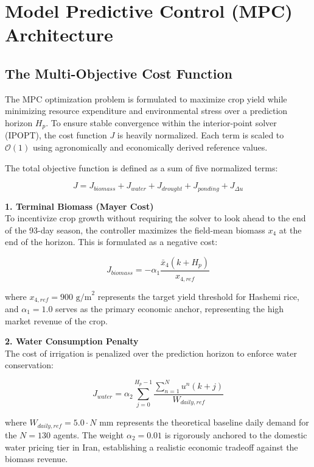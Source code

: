\documentclass[11pt, a4paper]{article}
\begin{document}
\section{Model Predictive Control (MPC) Architecture}

\subsection{The Multi-Objective Cost Function}
The MPC optimization problem is formulated to maximize crop yield while minimizing resource expenditure and environmental stress over a prediction horizon $H_p$. To ensure stable convergence within the interior-point solver (IPOPT), the cost function $J$ is heavily normalized. Each term is scaled to $\mathcal{O}(1)$ using agronomically and economically derived reference values.

The total objective function is defined as a sum of five normalized terms:

\begin{equation}
    J = J_{biomass} + J_{water} + J_{drought} + J_{ponding} + J_{\Delta u}
\end{equation}

\textbf{1. Terminal Biomass (Mayer Cost)} \\
To incentivize crop growth without requiring the solver to look ahead to the end of the 93-day season, the controller maximizes the field-mean biomass $x_4$ at the end of the horizon. This is formulated as a negative cost:

\begin{equation}
    J_{biomass} = -\alpha_1 \frac{\bar{x}_4(k+H_p)}{x_{4,ref}}
\end{equation}

where $x_{4,ref} = 900 \text{ g/m}^2$ represents the target yield threshold for Hashemi rice, and $\alpha_1 = 1.0$ serves as the primary economic anchor, representing the high market revenue of the crop.

\textbf{2. Water Consumption Penalty} \\
The cost of irrigation is penalized over the prediction horizon to enforce water conservation:

\begin{equation}
    J_{water} = \alpha_2 \sum_{j=0}^{H_p-1} \frac{\sum_{n=1}^{N} u^n(k+j)}{W_{daily,ref}}
\end{equation}

where $W_{daily,ref} = 5.0 \cdot N$ mm represents the theoretical baseline daily demand for the $N=130$ agents. The weight $\alpha_2 = 0.01$ is rigorously anchored to the domestic water pricing tier in Iran, establishing a realistic economic tradeoff against the biomass revenue.
\end{document}
